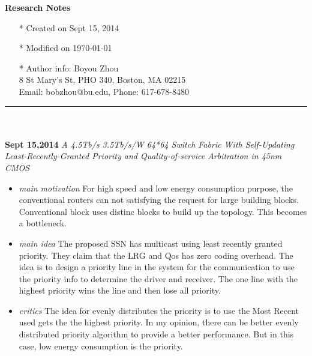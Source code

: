 \documentclass[]{article}
\begin{document}
\pagestyle{empty}
{\large\textbf{Research Notes}}
\begin{itemize}
    \item[*] Created on Sept 15, 2014
    \item[*] Modified on \today
    \item[*] Author info: Boyou Zhou\\
             8 St Mary's St, PHO 340, Boston, MA 02215\\
             Email: bobzhou@bu.edu, Phone: 617-678-8480
\end{itemize}

\rule[-0.1cm]{7.5in}{0.01cm}\\
\\
\noindent \textbf{Sept 15,2014}
\textit{A 4.5Tb/s 3.5Tb/s/W 64*64 Switch Fabric With Self-Updating Least-Recently-Granted Priority and Quality-of-service
        Arbitration in 45nm CMOS}
\indent		\begin{itemize}

            \item \textit{main motivation} For high speed and low energy consumption purpose, the conventional routers
            can not satisfying the request for large building blocks. Conventional block uses distinc blocks to build
            up the topology. This becomes a bottleneck.
            \item \textit{main idea} The proposed SSN has multicast using least recently granted priority. They claim 
            that the LRG and Qos has zero coding overhead. The idea is to design a priority line in the system for
            the communication to use the priority info to determine the driver and receiver. The one line with the 
            highest priority wins the line and then lose all priority.
            \item \textit{critics} The idea for evenly distributes the priority is to use the Most Recent used gets the
            the highest priority. In my opinion, there can be better evenly distributed priority algorithm to provide a
            better performance. But in this case, low energy consumption is the priority.

        \end{itemize}
\end{document}
